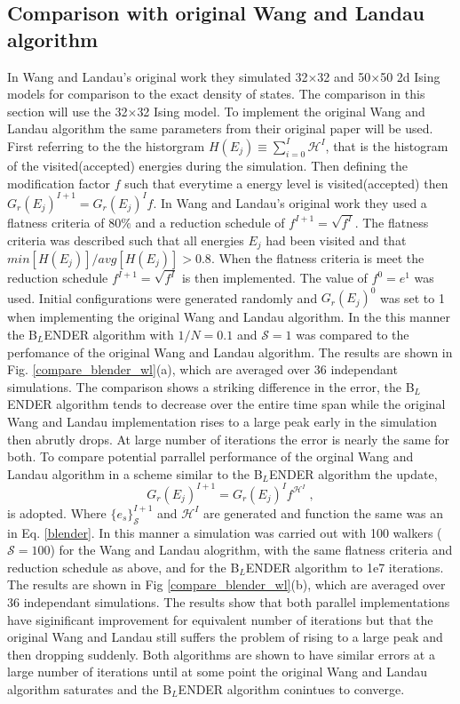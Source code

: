 \documentclass[aps,pre,reprint,superscriptaddress,showkeys]{revtex4-1}
\begin{document}
\subsection{Comparison with original Wang and Landau algorithm}
In Wang and Landau's original work they simulated  32$\times$32 and 50$\times$50 2d Ising models for comparison to the exact density of states. The comparison in this section will use the 32$\times$32 Ising model. To implement the original Wang and Landau algorithm the same parameters from their original paper will be used\cite{WL_phys_rev_lett}. First referring to the the historgram $H(E_j)\equiv \sum_{i=0}^{I}\mathcal{H}^I$, that is the histogram of the visited(accepted) energies during the simulation. Then defining the modification factor $f$ such that everytime a energy level is visited(accepted) then $G_r(E_j)^{I+1} = G_r(E_j)^{I}f$. In Wang and Landau's original work they used a flatness criteria of $80\%$ and a reduction schedule of $f^{I+1}= \sqrt{f^{I}}$. The flatness criteria was described such that all energies $E_j$ had been visited and that  $min[H(E_j)]/avg[H(E_j)] > 0.8$. When the flatness criteria is meet the reduction schedule $f^{I+1}= \sqrt{f^{I}}$ is then implemented. The value of $f^0 = e^1$ was used. Initial configurations were generated randomly and $G_r(E_j)^0$ was set to 1 when implementing the original Wang and Landau algorithm.  In the this manner the B$_L$ENDER algorithm with $1/N = 0.1$ and $\mathcal{S}=1$ was compared to the perfomance of the original Wang and Landau algorithm. The results are shown in Fig. \ref{compare_blender_wl}(a), which are averaged over 36 independant simulations. The comparison shows a striking difference in the error,  the B$_L$ENDER algorithm  tends to decrease over the entire time span while the original Wang and Landau implementation  rises to a large peak early in the simulation then abrutly drops. At large number of iterations the error is nearly the same for both. To compare potential parrallel performance of the orginal Wang and Landau algorithm in a scheme similar to the B$_L$ENDER algorithm the update,
\begin{equation}
G_r(E_j)^{I+1} = G_r(E_j)^{I}f^{\mathcal{H}^I}\;,
\label{parallelscheme}
\end{equation}
is adopted. Where $\{e_s\}^{I+1}_{\mathcal{S}}$ and $\mathcal{H}^I$ are generated and function the same was an in Eq. \ref{blender}. In this manner a simulation was carried out with 100 walkers ($\mathcal{S}=100$) for the Wang and Landau alogrithm, with the same flatness criteria and reduction schedule as above, and for the B$_L$ENDER algorithm to 1e7 iterations. The results are shown in Fig \ref{compare_blender_wl}(b), which are averaged over 36 independant simulations. The results show that both parallel implementations have siginificant improvement for equivalent number of iterations but that the original Wang and Landau still suffers the problem of rising to a large peak and then dropping suddenly. Both algorithms are shown to have similar errors at a large number of iterations until at some point the original Wang and Landau algorithm saturates and the B$_L$ENDER algorithm conintues to converge. 
\end{document}
